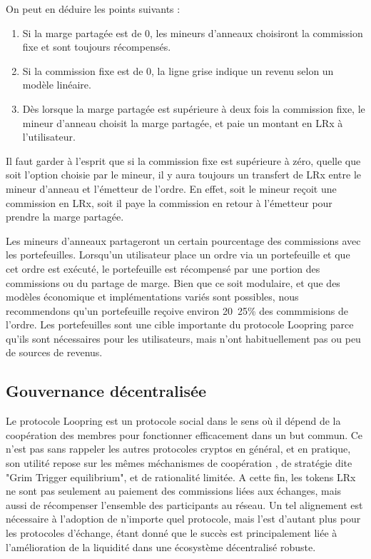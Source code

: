 \documentclass[UTF8,nofonts]{article}
\begin{document}
\begin{multicols}{2}
On peut en déduire les points suivants :
\begin{enumerate}
	\item Si la marge partagée est de 0, les mineurs d'anneaux choisiront la commission fixe et sont toujours récompensés.
	\item Si la commission fixe est de 0, la ligne grise indique un revenu selon un modèle linéaire.
	\item Dès lorsque la marge partagée est supérieure à deux fois la commission fixe, le mineur d'anneau choisit la marge partagée, et paie un montant en LRx à l'utilisateur.
\end{enumerate}

Il faut garder à l'esprit que si la commission fixe est supérieure à zéro, quelle que soit l'option choisie par le mineur, il y aura toujours un transfert de LRx entre le mineur d'anneau et l'émetteur de l'ordre. En effet, soit le mineur reçoit une commission en LRx, soit il paye la commission en retour à l'émetteur pour prendre la marge partagée.

Les mineurs d'anneaux partageront un certain pourcentage des commissions avec les portefeuilles. Lorsqu'un utilisateur place un ordre via un portefeuille et que cet ordre est exécuté, le portefeuille est récompensé par une portion des commissions ou du partage de marge. Bien que ce soit modulaire, et que des modèles économique et implémentations variés sont possibles, nous recommendons qu'un portefeuille reçoive environ 20~25\% des commmisions de l'ordre. Les portefeuilles sont une cible importante du protocole Loopring parce qu'ils sont nécessaires pour les utilisateurs, mais n'ont habituellement pas ou peu de sources de revenus.

\subsection{Gouvernance décentralisée}
Le protocole Loopring est un protocole social dans le sens où il dépend de la coopération des membres pour fonctionner efficacement dans un but commun. Ce n'est pas sans rappeler les autres protocoles cryptos en général, et en pratique, son utilité repose sur les mêmes méchanismes de coopération \cite{vitalikgovernance}, de stratégie dite "Grim Trigger equilibrium", et de rationalité limitée. A cette fin, les tokens LRx ne sont pas seulement au paiement des commissions liées aux échanges, mais aussi de récompenser l'ensemble des participants au réseau. Un tel alignement est nécessaire à l'adoption de n'importe quel protocole, mais l'est d'autant plus pour les protocoles d'échange, étant donné que le succès est principalement liée à l'amélioration de la liquidité dans une écosystème décentralisé robuste.


\end{multicols}
\end{document}
